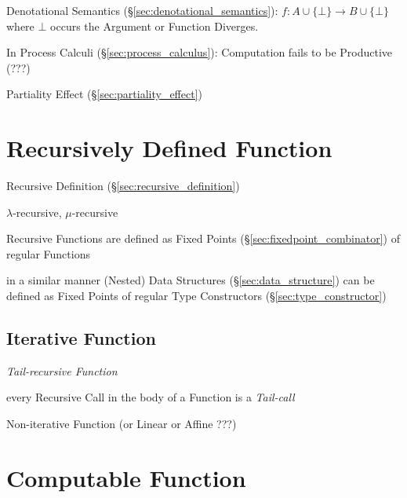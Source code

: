 Denotational Semantics (\S\ref{sec:denotational_semantics}): $f : A
\cup \{\bot\} \rightarrow B \cup \{\bot\}$ where $\bot$ occurs the
Argument or Function Diverges.

In Process Calculi (\S\ref{sec:process_calculus}): Computation fails
to be Productive (???) %

Partiality Effect (\S\ref{sec:partiality_effect})



\section{Recursively Defined Function}\label{sec:recursive_function}

Recursive Definition (\S\ref{sec:recursive_definition})

$\lambda$-recursive, $\mu$-recursive


Recursive Functions are defined as Fixed Points
(\S\ref{sec:fixedpoint_combinator}) of regular Functions

in a similar manner (Nested) Data Structures
(\S\ref{sec:data_structure}) can be defined as Fixed Points of regular
Type Constructors (\S\ref{sec:type_constructor})



\subsection{Iterative Function}\label{sec:iterative_function}

\emph{Tail-recursive Function}

every Recursive Call in the body of a Function is a \emph{Tail-call}

Non-iterative Function (or Linear or Affine ???) %



\section{Computable Function}\label{sec:computable_function}

